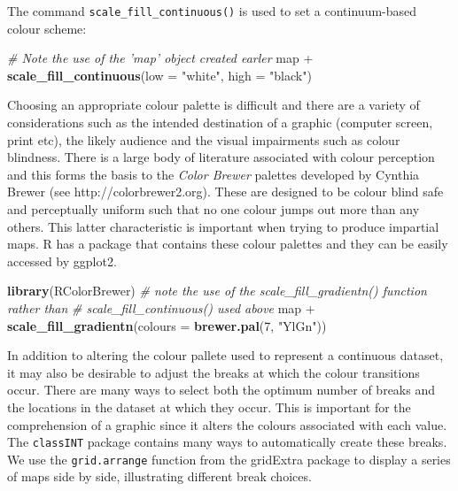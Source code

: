 \documentclass[]{article}
\newenvironment{Shaded}{}{}
\newcommand{\KeywordTok}[1]{\textcolor[rgb]{0.00,0.44,0.13}{\textbf{{#1}}}}
\newcommand{\DataTypeTok}[1]{\textcolor[rgb]{0.56,0.13,0.00}{{#1}}}
\newcommand{\DecValTok}[1]{\textcolor[rgb]{0.25,0.63,0.44}{{#1}}}
\newcommand{\StringTok}[1]{\textcolor[rgb]{0.25,0.44,0.63}{{#1}}}
\newcommand{\CommentTok}[1]{\textcolor[rgb]{0.38,0.63,0.69}{\textit{{#1}}}}
\newcommand{\NormalTok}[1]{{#1}}
\begin{document}
The command \texttt{scale\_fill\_continuous()} is used to set
a continuum-based colour scheme:

\begin{Shaded}
\begin{Highlighting}[]
\CommentTok{# Note the use of the 'map' object created earler}
\NormalTok{map + }\KeywordTok{scale_fill_continuous}\NormalTok{(}\DataTypeTok{low =} \StringTok{"white"}\NormalTok{, }\DataTypeTok{high =} \StringTok{"black"}\NormalTok{)}
\end{Highlighting}
\end{Shaded}

Choosing an appropriate colour palette is difficult and there are a variety of considerations such as the intended destination of a graphic (computer screen, print etc), the likely audience and the visual impairments such as colour blindness. There is a large body of literature associated with colour perception and this forms the basis to the \emph{Color Brewer} palettes developed
by Cynthia Brewer (see http://colorbrewer2.org). These are designed to
be colour blind safe and perceptually uniform such that no one colour
jumps out more than any others. This latter characteristic is important
when trying to produce impartial maps. R has a package that contains these
colour palettes and they can be easily accessed by ggplot2.

\begin{Shaded}
\begin{Highlighting}[]
\KeywordTok{library}\NormalTok{(RColorBrewer)}
\CommentTok{# note the use of the scale_fill_gradientn() function rather than}
\CommentTok{# scale_fill_continuous() used above}
\NormalTok{map + }\KeywordTok{scale_fill_gradientn}\NormalTok{(}\DataTypeTok{colours =} \KeywordTok{brewer.pal}\NormalTok{(}\DecValTok{7}\NormalTok{, }\StringTok{"YlGn"}\NormalTok{))}
\end{Highlighting}
\end{Shaded}

In addition to altering the colour pallete used to represent a continuous
dataset, it may also be desirable to adjust the breaks at which the colour
transitions occur. There are many ways to select both the optimum number
of breaks and the locations in the dataset at
which they occur. This is important for the comprehension of a graphic
since it alters the colours associated with each value. The
\texttt{classINT} package contains many ways to automatically create
these breaks. We use the \texttt{grid.arrange} function from the
gridExtra package to display a series of maps side by side,  illustrating different break choices. 
\end{document}
